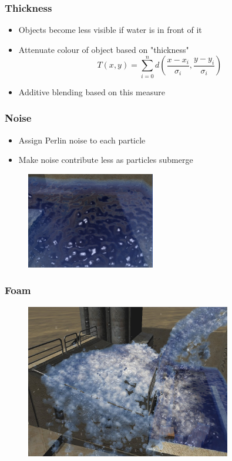 \documentclass{beamer}
\begin{document}
	\begin{frame}[t]\frametitle{Thickness}
	    \begin{itemize}
	    	\item Objects become less visible if water is in front of it
	    	\item Attenuate colour of object based on "thickness"
	    	\begin{equation}
	    		T(x, y) = \sum_{i = 0}^{n} d(\frac{x - x_i}{\sigma_i}, \frac{y - y_i}{\sigma_i})
	    	\end{equation}
	    	\item Additive blending based on this measure
	    \end{itemize}
	\end{frame}
	\begin{frame}[t]\frametitle{Noise}
	    \begin{itemize}
	    	\item Assign Perlin noise to each particle
	    	\item Make noise contribute less as particles submerge
	    \end{itemize}
	    \begin{figure}
			\centering
			\includegraphics[width=0.5\textwidth]{noise_water.png}
		\end{figure}
	\end{frame}
	\begin{frame}[t]\frametitle{Foam}
	    \begin{figure}
			\centering
			\includegraphics[width=0.8\textwidth]{foam.png}
		\end{figure}
	
	\end{frame}
\end{document}
